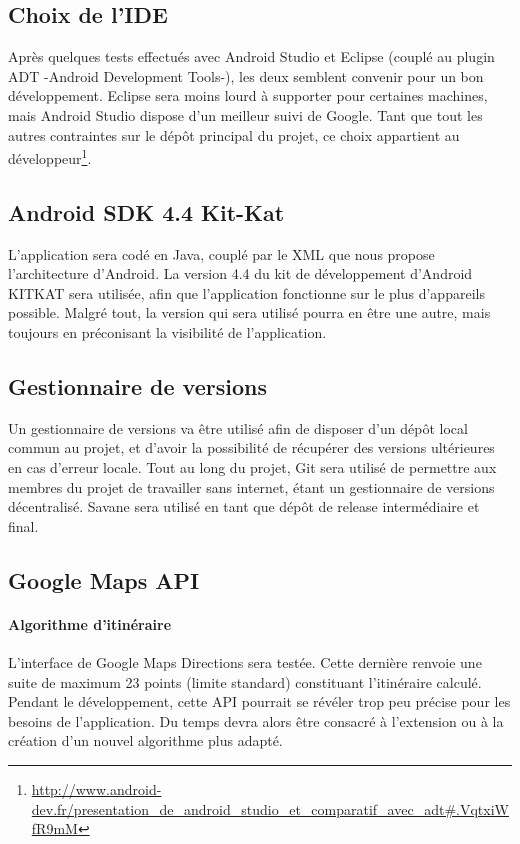 \documentclass[12pt]{report}
\begin{document}
\subsection{Choix de l'IDE} Après quelques tests effectués avec Android Studio et Eclipse (couplé au plugin ADT -Android Development Tools-), les deux semblent convenir pour un bon développement. Eclipse sera moins lourd à supporter pour certaines machines, mais Android Studio dispose d'un meilleur suivi de Google. Tant que tout les autres contraintes sur le dépôt principal du projet, ce choix appartient au développeur\footnote{\url{http://www.android-dev.fr/presentation_de_android_studio_et_comparatif_avec_adt\#.VqtxiWfR9mM}}.

\subsection{Android SDK 4.4 Kit-Kat } L'application sera codé en Java, couplé par le XML que nous propose l'architecture d'Android. La version 4.4 du kit de développement d'Android KITKAT sera utilisée, afin que l'application fonctionne sur le plus d'appareils possible. Malgré tout, la version qui sera utilisé pourra en être une autre, mais toujours en préconisant la visibilité de l'application.

\subsection{Gestionnaire de versions } Un gestionnaire de versions va être utilisé afin de disposer d'un dépôt local commun au projet, et d'avoir la possibilité de récupérer des versions ultérieures en cas d'erreur locale. Tout au long du projet, Git sera utilisé de permettre aux membres du projet de travailler sans internet, étant un gestionnaire de versions décentralisé. Savane sera utilisé en tant que dépôt de release intermédiaire et final.

\subsection{Google Maps API } 
\paragraph{Algorithme d'itinéraire} L'interface de Google Maps Directions sera testée. Cette dernière renvoie une suite de maximum 23 points (limite standard) constituant l'itinéraire calculé. Pendant le développement, cette API pourrait se révéler trop peu précise pour les besoins de l'application. Du temps devra alors être consacré à l'extension ou à la création d'un nouvel algorithme plus adapté. 
\end{document}
